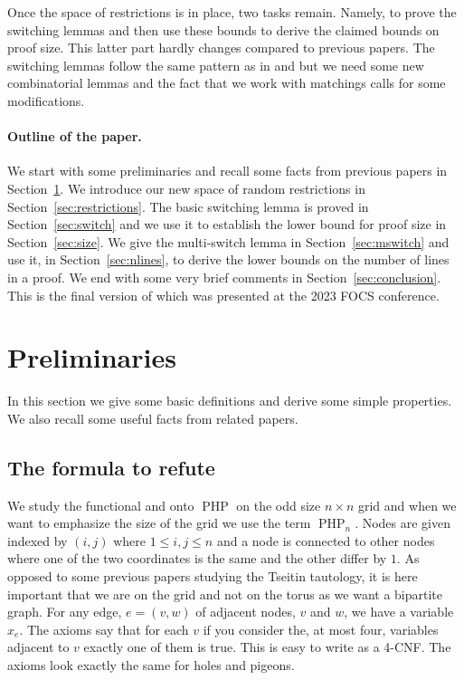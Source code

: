 \documentclass{theoretics}
\DeclareMathOperator{\PHP}{PHP}
\begin{document}
Once the space of restrictions is in place, two
tasks remain.  Namely, to prove the switching lemmas
and then use these bounds to derive the claimed
bounds on proof size.  This latter part hardly
changes compared to previous papers.  The switching lemmas follow
the same pattern as in \cite{jhtseitin} and \cite{jhkr}
but we need some new combinatorial lemmas and the
fact that we work with matchings calls
for some modifications.

\paragraph{Outline of the paper.}
We start with some preliminaries and recall some facts
from previous papers in Section~\ref{sec:prelim}.
We introduce our new space of random
restrictions in Section~\ref{sec:restrictions}.
The basic switching lemma is proved in
Section~\ref{sec:switch} and we use
it to establish the lower bound for proof size
in Section~\ref{sec:size}.  We give
the multi-switch lemma in Section~\ref{sec:mswitch} and
use it, in Section~\ref{sec:nlines}, to derive the lower bounds on the
number of lines in a proof.
We end with some very brief comments in Section~\ref{sec:conclusion}.
This is the final version of \cite{jhphpfocs} which was presented
at the 2023 FOCS conference.

\section{Preliminaries} \label{sec:prelim}

In this section we give some basic definitions and derive some
simple properties.  We also recall some
useful facts from related papers.


\subsection{The formula to refute}

We study the functional and onto $\PHP$ 
on the odd size $n\times n$ grid and when we want to emphasize
the size of the grid we use the term $\PHP_n$. Nodes are given indexed
by $(i,j)$ where $1 \leq i,j \leq n$ and a node is connected
to other nodes where one of the two coordinates is the same
and the other differ by $1$.  As opposed to some previous
papers studying the Tseitin tautology,
it is here important that we are on the grid and not on
the torus as we want a bipartite graph.  For any edge, $e=(v,w)$ of adjacent
nodes, $v$ and $w$, we have a variable $x_{e}$.  The axioms say that for each
$v$ if you consider the, at most four, variables adjacent to $v$
exactly one of them is true.  This is easy to write as
a 4-CNF.  The axioms look exactly the same
for holes and pigeons.  
\end{document}
